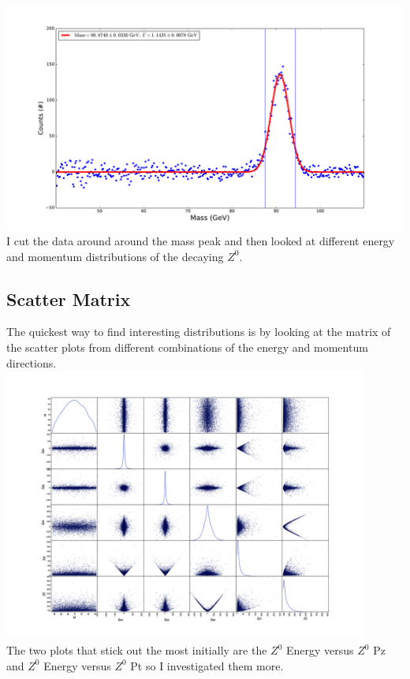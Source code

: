 \documentclass[a4paper, 11pt]{article}
\begin{document}
\includegraphics[width=\textwidth]{Z_stuff/Z_peak.pdf} \\

I cut the data around around the mass peak and then looked at different energy and momentum distributions of the decaying $Z^0$.

\subsection*{Scatter Matrix}
The quickest way to find interesting distributions is by looking at the matrix of the scatter plots from different combinations of the energy and momentum directions. \\
\includegraphics[width=0.9\textwidth]{Z_stuff/scatter_matrix.jpg} \\

The two plots that stick out the most initially are the $Z^0$ Energy versus $Z^0$ Pz and $Z^0$ Energy versus $Z^0$ Pt so I investigated them more. 
\end{document}
